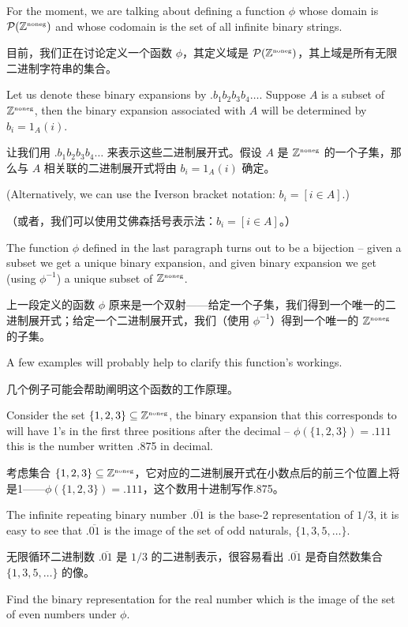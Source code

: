 For the moment, we are talking about 
defining a function $\phi$ whose domain is ${\mathcal P}({\mathbb Z}^{\mbox{\tiny noneg}})$ and 
whose codomain is the set of all infinite binary strings.

目前，我们正在讨论定义一个函数 $\phi$，其定义域是 ${\mathcal P}({\mathbb Z}^{\mbox{\tiny noneg}})$，其上域是所有无限二进制字符串的集合。

Let us denote these binary expansions by
$.b_1b_2b_3b_4\ldots$.  Suppose $A$ is a subset of ${\mathbb Z}^{\mbox{\tiny noneg}}$,
then the binary expansion associated with $A$ will be
determined by $b_i = 1_A(i)$.

让我们用 $.b_1b_2b_3b_4\ldots$ 来表示这些二进制展开式。假设 $A$ 是 ${\mathbb Z}^{\mbox{\tiny noneg}}$ 的一个子集，那么与 $A$ 相关联的二进制展开式将由 $b_i = 1_A(i)$ 确定。

(Alternatively, we can use the Iverson 
bracket notation: $b_i = [i \in A]$.)   

（或者，我们可以使用艾佛森括号表示法：$b_i = [i \in A]$。）

The function $\phi$ defined in the last paragraph turns out to be a 
bijection -- given a subset we get a unique binary expansion, and given 
binary expansion we get (using $\phi^{-1}$) a unique subset  of 
${\mathbb Z}^{\mbox{\tiny noneg}}$.

上一段定义的函数 $\phi$ 原来是一个双射——给定一个子集，我们得到一个唯一的二进制展开式；给定一个二进制展开式，我们（使用 $\phi^{-1}$）得到一个唯一的 ${\mathbb Z}^{\mbox{\tiny noneg}}$ 的子集。

A few examples will
probably help to clarify this function's workings.

几个例子可能会帮助阐明这个函数的工作原理。

Consider 
the set $\{1,2,3\} \subseteq {\mathbb Z}^{\mbox{\tiny noneg}}$, the binary expansion that this
corresponds to will have 1's in the first three positions after the 
decimal -- $\phi(\{1,2,3\}) = .111$ this is the number written .875
in decimal.

考虑集合 $\{1,2,3\} \subseteq {\mathbb Z}^{\mbox{\tiny noneg}}$，它对应的二进制展开式在小数点后的前三个位置上将是1——$\phi(\{1,2,3\}) = .111$，这个数用十进制写作.875。

The infinite repeating binary number $.\overline{01}$ 
is the base-2 representation of $1/3$, it is easy to see that
$.\overline{01}$ is the image of the set of odd naturals, $\{1,3,5,\ldots\}$.

无限循环二进制数 $.\overline{01}$ 是 $1/3$ 的二进制表示，很容易看出 $.\overline{01}$ 是奇自然数集合 $\{1,3,5,\ldots\}$ 的像。

\begin{exer}
Find the binary representation for the real number which is the image of
the set of even numbers under $\phi$.
\end{exer}

